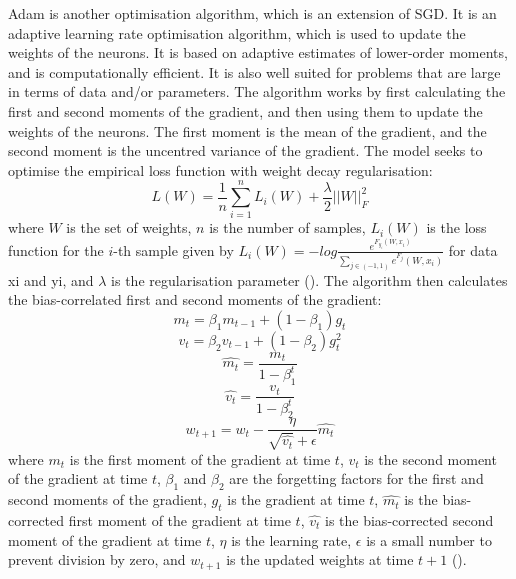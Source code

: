 \documentclass[12pt]{report}
\begin{document}
Adam is another optimisation algorithm, which is an extension of SGD. It is an adaptive learning rate optimisation algorithm, which is used to update the weights of the neurons. It is based on adaptive estimates of lower-order moments, and is computationally efficient. It is also well suited for problems that are large in terms of data and/or parameters. The algorithm works by first calculating the first and second moments of the gradient, and then using them to update the weights of the neurons. The first moment is the mean of the gradient, and the second moment is the uncentred variance of the gradient. The model seeks to optimise the empirical loss function with weight decay regularisation:
\begin{equation}
	L(W) = \frac{1}{n}\sum_{i=1}^{n}L_i(W)+\frac{\lambda}{2}||W||_F^2
\end{equation}
where $W$ is the set of weights, $n$ is the number of samples, $L_i(W)$ is the loss function for the $i$-th sample given by $L_i(W)=-log\frac{e^{F_{y_i}(W,x_i)}}{\sum_{j\in(-1,1)}e^{F_j}(W,x_i)}$ for data x\textunderscore i and y\textunderscore i, and $\lambda$ is the regularisation parameter (\cite{zou2021}). The algorithm then calculates the bias-correlated first and second moments of the gradient:
\begin{equation}
	m_t = \beta_1 m_{t-1} + (1-\beta_1)g_t
\end{equation}
\begin{equation}
	v_t = \beta_2 v_{t-1} + (1-\beta_2)g_t^2
\end{equation}
\begin{equation}
	\hat{m_t} = \frac{m_t}{1-\beta_1^t}
\end{equation}
\begin{equation}
	\hat{v_t} = \frac{v_t}{1-\beta_2^t}
\end{equation}
\begin{equation}
	w_{t+1} = w_t - \frac{\eta}{\sqrt{\hat{v_t}}+\epsilon}\hat{m_t}
\end{equation}
where $m_t$ is the first moment of the gradient at time $t$, $v_t$ is the second moment of the gradient at time $t$, $\beta_1$ and $\beta_2$ are the forgetting factors for the first and second moments of the gradient, $g_t$ is the gradient at time $t$, $\hat{m_t}$ is the bias-corrected first moment of the gradient at time $t$, $\hat{v_t}$ is the bias-corrected second moment of the gradient at time $t$, $\eta$ is the learning rate, $\epsilon$ is a small number to prevent division by zero, and $w_{t+1}$ is the updated weights at time $t+1$ (\cite{kingma2017}).
\end{document}
